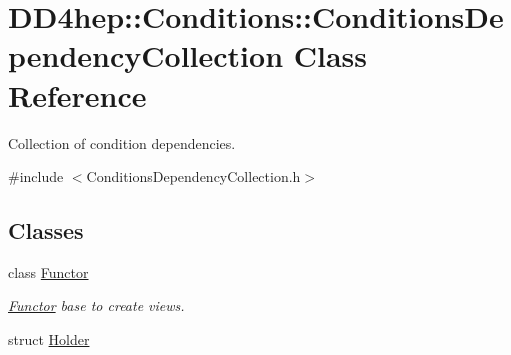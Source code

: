 \hypertarget{class_d_d4hep_1_1_conditions_1_1_conditions_dependency_collection}{}\section{D\+D4hep\+:\+:Conditions\+:\+:Conditions\+Dependency\+Collection Class Reference}
\label{class_d_d4hep_1_1_conditions_1_1_conditions_dependency_collection}


Collection of condition dependencies.  




{\ttfamily \#include $<$Conditions\+Dependency\+Collection.\+h$>$}

\subsection*{Classes}
\begin{DoxyCompactItemize}
\item 
class \hyperlink{class_d_d4hep_1_1_conditions_1_1_conditions_dependency_collection_1_1_functor}{Functor}
\begin{DoxyCompactList}\small\item\em \hyperlink{class_d_d4hep_1_1_conditions_1_1_conditions_dependency_collection_1_1_functor}{Functor} base to create views. \end{DoxyCompactList}\item 
struct \hyperlink{struct_d_d4hep_1_1_conditions_1_1_conditions_dependency_collection_1_1_holder}{Holder}
\end{DoxyCompactItemize}
